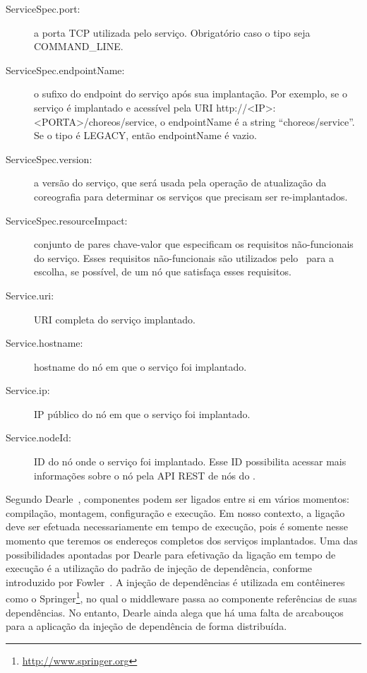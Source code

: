 \begin{description}
\item [ServiceSpec.port:] a porta TCP utilizada pelo serviço. Obrigatório caso o tipo seja COMMAND\_LINE.

\item [ServiceSpec.endpointName:] o sufixo do endpoint do serviço após sua implantação. Por exemplo, se o serviço é implantado e acessível pela URI http://<IP>:<PORTA>/choreos/service, o endpointName é a string ``choreos/service''. Se o tipo é LEGACY, então endpointName é vazio.

\item [ServiceSpec.version:] a versão do serviço, que será usada pela operação de atualização da coreografia para determinar os serviços que precisam ser re-implantados.

\item [ServiceSpec.resourceImpact:] conjunto de pares chave-valor que especificam os requisitos não-funcionais do serviço. Esses requisitos não-funcionais são utilizados pelo \dm\ para a escolha, se possível, de um nó que satisfaça esses requisitos.

\item [Service.uri:] URI completa do serviço implantado.

\item [Service.hostname:] hostname do nó em que o serviço foi implantado.

\item [Service.ip:] IP público do nó em que o serviço foi implantado.

\item [Service.nodeId:] ID do nó onde o serviço foi implantado. Esse ID possibilita acessar mais informações sobre o nó pela API REST de nós do \dm. 

\end{description}

Segundo Dearle~\cite{Dearle2007PastPresentFuture}, componentes podem ser ligados entre si em vários momentos: compilação, montagem, configuração e execução. Em nosso contexto, a ligação deve ser efetuada necessariamente em tempo de execução, pois é somente nesse momento que teremos os endereços completos dos serviços implantados. Uma das possibilidades apontadas por Dearle para efetivação da ligação em tempo de execução é a utilização do padrão de injeção de dependência, conforme introduzido por Fowler~\cite{Fowler2004Inversion}. A injeção de dependências é utilizada em contêineres como o Springer\footnote{\url{http://www.springer.org}}, no qual o middleware passa ao componente referências de suas dependências. No entanto, Dearle ainda alega que há uma falta de arcabouços para a aplicação da injeção de dependência de forma distribuída.

